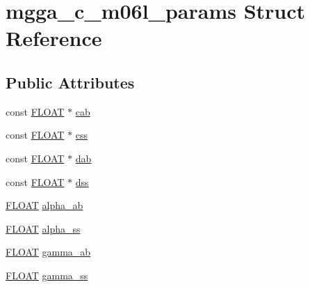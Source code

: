 \hypertarget{structmgga__c__m06l__params}{\section{mgga\-\_\-c\-\_\-m06l\-\_\-params Struct Reference}
\label{structmgga__c__m06l__params}
}
\subsection*{Public Attributes}
\begin{DoxyCompactItemize}
\item 
const \hyperlink{src_2xc__config_8h_ae8690abbffa85934d64d545920e2b108}{F\-L\-O\-A\-T} $\ast$ \hyperlink{structmgga__c__m06l__params_aeaf3b17fcee7815ed924c9f8412419fb}{cab}
\item 
const \hyperlink{src_2xc__config_8h_ae8690abbffa85934d64d545920e2b108}{F\-L\-O\-A\-T} $\ast$ \hyperlink{structmgga__c__m06l__params_a58099ec3cdd0c2fbf2e71e1bd90434e7}{css}
\item 
const \hyperlink{src_2xc__config_8h_ae8690abbffa85934d64d545920e2b108}{F\-L\-O\-A\-T} $\ast$ \hyperlink{structmgga__c__m06l__params_aad8af0a6eb75716eaa474b849b0d10e0}{dab}
\item 
const \hyperlink{src_2xc__config_8h_ae8690abbffa85934d64d545920e2b108}{F\-L\-O\-A\-T} $\ast$ \hyperlink{structmgga__c__m06l__params_af80cb08635dd1594ae4352e797ca1543}{dss}
\item 
\hyperlink{src_2xc__config_8h_ae8690abbffa85934d64d545920e2b108}{F\-L\-O\-A\-T} \hyperlink{structmgga__c__m06l__params_aac6895f9eb8e9e27d2b65fa36cec7bcb}{alpha\-\_\-ab}
\item 
\hyperlink{src_2xc__config_8h_ae8690abbffa85934d64d545920e2b108}{F\-L\-O\-A\-T} \hyperlink{structmgga__c__m06l__params_a56cbf1e82c93e76eaf30427666cd006d}{alpha\-\_\-ss}
\item 
\hyperlink{src_2xc__config_8h_ae8690abbffa85934d64d545920e2b108}{F\-L\-O\-A\-T} \hyperlink{structmgga__c__m06l__params_a98ef42b76af9bbb1cfed0292cbd30d84}{gamma\-\_\-ab}
\item 
\hyperlink{src_2xc__config_8h_ae8690abbffa85934d64d545920e2b108}{F\-L\-O\-A\-T} \hyperlink{structmgga__c__m06l__params_abbe6771a61c5531107612f73e50ceb99}{gamma\-\_\-ss}
\end{DoxyCompactItemize}


